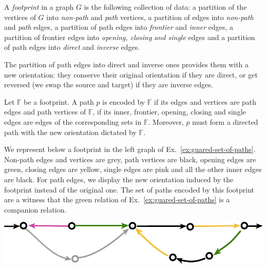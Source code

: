  
 \begin{definition}[Footprint] A \emph{footprint} in a graph $G$  is the following collection of data: a partition of the vertices of $G$ into \emph{non-path} and \emph{path} vertices, a partition of edges into \emph{non-path} and \emph{path} edges, a partition of path edges into \emph{frontier} and \emph{inner} edges, a partition of frontier edges into \emph{opening, closing and single} edges and a partition of path edges into \emph{direct} and \emph{inverse} edges.
 
 The partition of path edges into direct and inverse ones provides them with a new orientation:  they conserve their original  orientation if they are direct, or get reversed (we swap the source and target) if they are inverse edges.  
 
 Let $\mathbb{F}$ be a footprint. A path $p$ is encoded by $\mathbb{F}$  if its edges and vertices are path edges and path vertices of $\mathbb{F}$,  if its inner, frontier, opening, closing and single edges are edges of the corresponding sets in $\mathbb{F}$.  Moreover, $p$ must form a directed path with the new orientation dictated by $\mathbb{F}$. 
 \end{definition}
 


\begin{example} We represent below a footprint in the left graph of Ex.~\ref{ex:guared-set-of-paths}. Non-path edges and vertices are  grey, path vertices are  black, opening edges are green, closing edges are yellow, single edges are pink and all the other inner edges are black. For path edges, we display the new orientation induced by the footprint instead of the original one. The set of paths encoded by this footprint are a witness that the green relation of Ex.~\ref{ex:guared-set-of-paths} is a companion relation. 
   \begin{center} 
 \includegraphics[scale=.45]{Pictures/encoding-set-of-paths.pdf}
 \end{center}
 \end{example}
  
